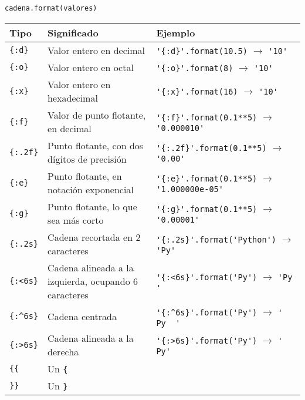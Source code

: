 \begin{referencia_python}
\begin{sintaxis}{\lstinline!cadena.format(valores)!}
\begin{center}
\begin{tabular}{l p{4cm} l}
 Tipo & Significado & Ejemplo \\
\hline
\verb!{:d}! & {\footnotesize Valor entero en decimal} & \lstinline!'{:d}'.format(10.5)! $\rightarrow$ \lstinline!'10'! \\
\verb!{:o}! & {\footnotesize Valor entero en octal} & \lstinline!'{:o}'.format(8)! $\rightarrow$ \lstinline!'10'! \\
\verb!{:x}! & {\footnotesize Valor entero en hexadecimal} & \lstinline!'{:x}'.format(16)! $\rightarrow$ \lstinline!'10'! \\
\verb!{:f}! & {\footnotesize Valor de punto flotante, en decimal} &
  \lstinline!'{:f}'.format(0.1**5)! $\rightarrow$ \lstinline!'0.000010'! \\
\verb!{:.2f}! & {\footnotesize Punto flotante, con dos dígitos de precisión} &
  \lstinline!'{:.2f}'.format(0.1**5)! $\rightarrow$ \lstinline!'0.00'! \\
\verb!{:e}! & {\footnotesize Punto flotante, en notación exponencial} &
  \lstinline!'{:e}'.format(0.1**5)! $\rightarrow$ \lstinline!'1.000000e-05'! \\
\verb!{:g}! & {\footnotesize Punto flotante, lo que sea más corto} &
  \lstinline!'{:g}'.format(0.1**5)! $\rightarrow$ \lstinline!'0.00001'! \\
\verb!{:.2s}! & {\footnotesize Cadena recortada en 2 caracteres} &
  \lstinline!'{:.2s}'.format('Python')! $\rightarrow$ \lstinline!'Py'! \\
\verb!{:<6s}! & {\footnotesize Cadena alineada a la izquierda, ocupando 6 caracteres} &
  \lstinline!'{:<6s}'.format('Py')! $\rightarrow$ \lstinline!'Py    '! \\
\verb!{:^6s}! & {\footnotesize Cadena centrada} &
  \lstinline!'{:^6s}'.format('Py')! $\rightarrow$ \lstinline!'  Py  '! \\
\verb!{:>6s}! & {\footnotesize Cadena alineada a la derecha} &
  \lstinline!'{:>6s}'.format('Py')! $\rightarrow$ \lstinline!'    Py'! \\
\verb!{{! & {\footnotesize Un \verb!{!} \\
\verb!}}! & {\footnotesize Un \verb!}!} \\
\end{tabular}
\end{center}

\end{sintaxis}

\end{referencia_python}


